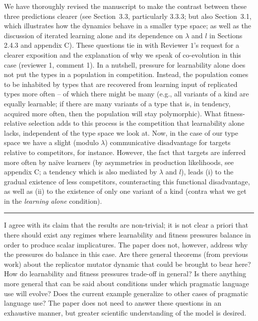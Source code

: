 \documentclass[12pt,a4paper]{article}
\begin{document}
We have thoroughly revised the manuscript to make the contrast between these three predictions clearer (see Section~3.3, particularly 3.3.3; but also Section~3.1, which illustrates how the dynamics behave in a smaller type space; as well as the discussion of iterated learning alone and its dependence on $\lambda$ and $l$ in Sections 2.4.3 and appendix C). These questions tie in with Reviewer $1$'s request for a clearer exposition and the explanation of why we speak of co-evolution in this case (reviewer 1, comment 1). In a nutshell, pressure for learnability alone does not put the types in a population in competition. Instead, the population comes to be inhabited by types that are recovered from learning input of replicated types more often -- of which there might be many (e.g., all variants of a kind are equally learnable; if there are many variants of a type that is, in tendency, acquired more often, then the population will stay polymorphic). What fitness-relative selection adds to this process is the competition that learnability alone lacks, independent of the type space we look at. Now, in the case of our type space we have a slight (modulo $\lambda$) communicative disadvantage for targets relative to competitors, for instance. However, the fact that targets are inferred more often by na\"ive learners (by asymmetries in production likelihoods, see appendix C; a tendency which is also mediated by $\lambda$ and $l$), leads (i) to the gradual existence of less competitors, counteracting this functional disadvantage, as well as (ii) to the existence of only one variant of a kind (contra what we get in the {\em learning alone} condition).
%

\vspace{0.5cm}

\noindent\rule{\textwidth}{1pt}

\begin{mdframed}[backgroundcolor=gray!25,linecolor=gray!25,frametitle= Reviewer \thereviewerCounter~comment \thereviewerCommentCounter \hfill ~~({\it Model predictions})]
%
I agree with its claim that the results are non-trivial; it is not clear a priori that there should exist any regimes where learnability and fitness pressures balance in order to produce scalar implicatures. The paper does not, however, address why the pressures do balance in this case. Are there general theorems (from previous work) about the replicator mutator dynamic that could be brought to bear here? How do learnability and fitness pressures trade-off in general? Is there anything more general that can be said about conditions under which pragmatic language use will evolve? Does the current example generalize to other cases of pragmatic language use? The paper does not need to answer these questions in an exhaustive manner, but greater scientific understanding of the model is desired.
\end{mdframed}
\end{document}
